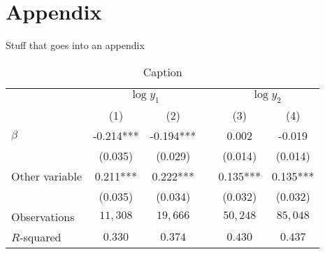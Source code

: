 \documentclass[12pt]{article}
\begin{document}
\lipsum[5-6]








\newpage\clearpage
\appendix 
\setcounter{figure}{0} \renewcommand{\thefigure}{A\arabic{figure}}
\setcounter{table}{0} \renewcommand{\thetable}{A\arabic{table}}

\section*{Appendix}
Stuff that goes into an appendix

\lipsum[7]

\begin{table}[h]
    \centering
    \begin{tabular}{lSScSS}
    &  && 
       \\
            & {(1)}     & {(2)}     && {(3)}     & {(4)}     \\ \midrule
    $\beta$
            & -0.214*** & -0.194*** &&  0.002    & -0.019    \\
            & (0.035)   & (0.029)   && (0.014)   & (0.014)   \\
    Other variable
            &  0.211*** &  0.222*** &&  0.135*** &  0.135*** \\
            & (0.035)   & (0.034)   && (0.032)   & (0.032)   \\ \midrule
    Observations 
            &  {$11,308$} & {$19,666$}  && {$50,248$}  & {$85,048$}  \\
    $R$-squared
            & {$0.330$}   & {$0.374$}   && {$0.430$}   & {$0.437$}   \\ \bottomrule
    \end{tabular}
    \caption{Caption}
    \label{tab:my_label}
\end{table}
\end{document}
